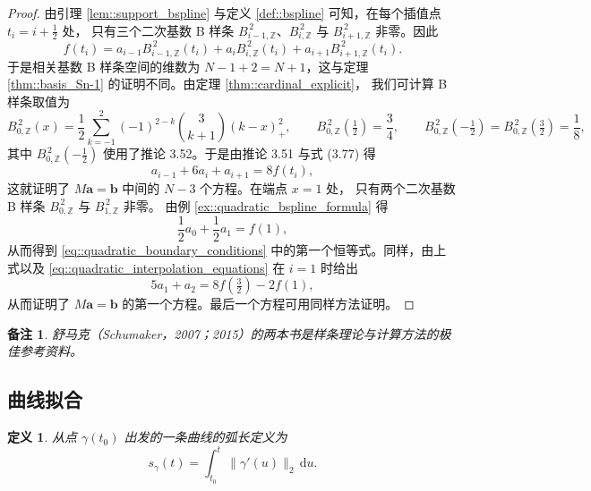 \documentclass[a4paper]{ctexart}
\newtheorem{remark}{备注}
\newtheorem{definition}[theorem]{定义} %
\numberwithin{theorem}{section}
\numberwithin{equation}{section}
\numberwithin{figure}{section}
\numberwithin{remark}{section}
\begin{document}
\begin{proof}
由引理 \ref{lem::support_bspline} 与定义 \ref{def::bspline} 可知，在每个插值点 $t_i=i+\tfrac{1}{2}$ 处，
只有三个二次基数 B 样条 $B^{\,2}_{i-1,\mathbb{Z}}$、$B^{\,2}_{i,\mathbb{Z}}$ 与 $B^{\,2}_{i+1,\mathbb{Z}}$ 非零。因此
\begin{equation} 
f(t_i)=a_{i-1}B^{\,2}_{i-1,\mathbb{Z}}(t_i)+a_iB^{\,2}_{i,\mathbb{Z}}(t_i)+a_{i+1}B^{\,2}_{i+1,\mathbb{Z}}(t_i).
\end{equation}
于是相关基数 B 样条空间的维数为 $N-1+2=N+1$，这与定理 \ref{thm::basis_Sn-1} 的证明不同。由定理 \ref{thm::cardinal_explicit}，
我们可计算 B 样条取值为
\[
B^{\,2}_{0,\mathbb{Z}}(x)=\frac{1}{2}\sum_{k=-1}^{2}(-1)^{2-k}\binom{3}{k+1}(k-x)^{2}_{+},
\qquad
B^{\,2}_{0,\mathbb{Z}}\!\left(\tfrac{1}{2}\right)=\frac{3}{4},
\qquad
B^{\,2}_{0,\mathbb{Z}}\!\left(-\tfrac{1}{2}\right)=B^{\,2}_{0,\mathbb{Z}}\!\left(\tfrac{3}{2}\right)=\frac{1}{8},
\]
其中 $B^{\,2}_{0,\mathbb{Z}}\!\left(-\tfrac{1}{2}\right)$ 使用了推论 3.52。于是由推论 3.51 与式 (3.77) 得
\begin{equation} 
    \label{eq::quadratic_interpolation_equations}
a_{i-1}+6a_i+a_{i+1}=8f(t_i),
\end{equation}
这就证明了 $M\mathbf{a}=\mathbf{b}$ 中间的 $N-3$ 个方程。在端点 $x=1$ 处，
只有两个二次基数 B 样条 $B^{\,2}_{0,\mathbb{Z}}$ 与 $B^{\,2}_{1,\mathbb{Z}}$ 非零。
由例 \ref{ex::quadratic_bspline_formula} 得
\[
\frac{1}{2}a_0+\frac{1}{2}a_1=f(1),
\]
从而得到 \eqref{eq::quadratic_boundary_conditions} 中的第一个恒等式。同样，由上式以及 \eqref{eq::quadratic_interpolation_equations} 在 $i=1$ 时给出
\[
5a_1+a_2=8f\!\left(\tfrac{3}{2}\right)-2f(1),
\]
从而证明了 $M\mathbf{a}=\mathbf{b}$ 的第一个方程。最后一个方程可用同样方法证明。
\end{proof}

\begin{remark}
舒马克（Schumaker，2007；2015）的两本书是样条理论与计算方法的极佳参考资料。
\end{remark}

\subsection{曲线拟合}
\label{subsec::curve_fitting}

\begin{definition}
    \label{def::arc_length}
从点 $\gamma(t_0)$ 出发的一条曲线的弧长定义为
\begin{equation}
    \label{eq::arc_length_def} 
s_\gamma(t)=\int_{t_0}^{t}\lVert\gamma'(u)\rVert_{2}\, \mathrm{d}u.
\end{equation}
\end{definition}
\end{document}
